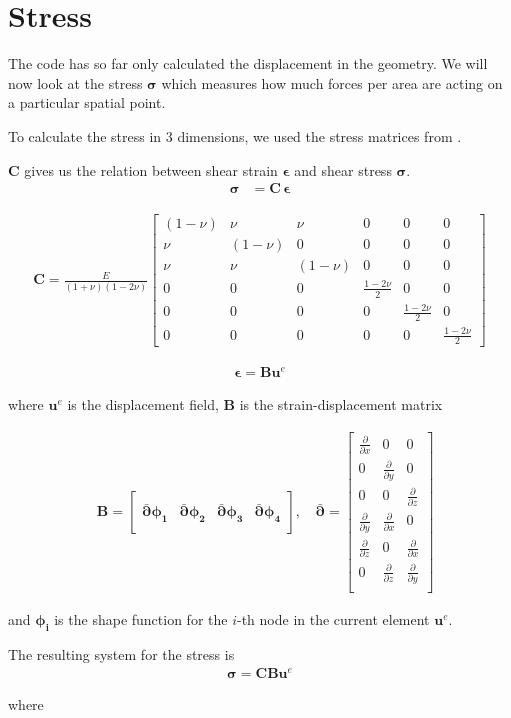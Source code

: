 \section{Stress}

The code has so far only calculated the displacement in the geometry. We will now look at the stress $\bm{\sigma}$ which measures how much forces per area are acting on a particular spatial point. 

To calculate the stress in 3 dimensions, we used the stress matrices from \cite{stressMatrix}.


$\bm{C}$ gives us the relation between shear strain $\bm{\epsilon}$ and shear stress $\bm{\sigma}$.
\begin{align*}
\bm{\sigma} &= \bm{C} \, \bm{\epsilon}
\end{align*}


\begin{align*}
\bm{C} = \frac{E}{(1+\nu)(1-2\nu)}
\begin{bmatrix}
(1-\nu) & \nu & \nu & 0 & 0 & 0 \\
\nu & (1-\nu) & 0 & 0 & 0 & 0 \\
\nu & \nu & (1-\nu) & 0 & 0 & 0 \\
0 & 0 & 0 & \frac{1-2\nu}{2} & 0 & 0 \\
0 & 0 & 0 & 0 & \frac{1-2\nu}{2} & 0 \\
0 & 0 & 0 & 0 & 0 & \frac{1-2\nu}{2}
\end{bmatrix}
\end{align*}




\begin{align*}
\bm{\epsilon} = \bm{B} \bm{u}^e
\end{align*}

where $\bm{u}^e$ is the displacement field, $\bm{B}$ is the strain-displacement matrix

\begin{align*}
&\bm{B} = 
\begin{bmatrix} \\
\bar{\bm{\partial}} \bm{\phi_1} & \bar{\bm{\partial}} \bm{\phi_2} & \bar{\bm{\partial}} \bm{\phi_3} & \bar{\bm{\partial}} \bm{\phi_4} \\[1em]
\end{bmatrix}, \,&
\bar{\bm{\partial}} = 
\begin{bmatrix}
\frac{\partial}{\partial x} & 0 & 0 \\[0.3em]
0 & \frac{\partial}{\partial y} & 0 \\[0.3em]
0 & 0 & \frac{\partial}{\partial z} \\[0.3em]
\frac{\partial}{\partial y} & \frac{\partial}{\partial x} & 0 \\[0.3em]
\frac{\partial}{\partial z} & 0 & \frac{\partial}{\partial x}\\[0.3em]
0 & \frac{\partial}{\partial z} & \frac{\partial}{\partial y} \\
\end{bmatrix}
\end{align*}

and $\bm{\phi_i}$ is the shape function for the $i$-th node in the current element $\bm{u}^e$.

The resulting system for the stress is 
\begin{align*}
\bm{\sigma} = \bm{C} \bm{B} \bm{u}^e
\end{align*}

where 